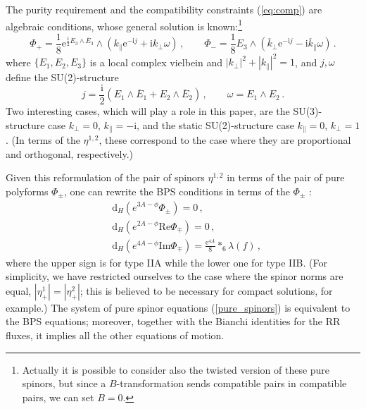 \documentclass[12pt]{article}
\renewcommand{\Re}{\mathrm{Re}}
\renewcommand{\Im}{\mathrm{Im}}
\newcommand{\dd}{\mathrm{d}}
\newcommand{\e}{\mathrm{e}}
\newcommand{\ii}{\mathrm{i}}
\begin{document}
The purity requirement and the compatibility constraints (\ref{eq:comp}) are algebraic conditions, whose general solution is known:\footnote{Actually it is possible to consider also the twisted version of these pure spinors, but since a $B$-transformation sends compatible pairs in compatible pairs, we can set $B=0$.}
\begin{equation}
\label{eq:dynamicSU(2)}
\Phi_+ = \frac{1}{8} \e^{\frac{1}{2} E_3 \wedge \overline{E}_3} \wedge (k_\parallel\e^{- \ii j} + \ii k_\perp \omega) \, , \qquad \Phi_- = \frac{1}{8}  E_3 \wedge (\overline{k}_\perp \e^{- \ii j} - \ii \overline{k}_\parallel  \omega) \, .
\end{equation}
where $\{E_1,E_2,E_3\}$ is a local complex vielbein and $|k_\perp|^2 + |k_\parallel|^2=1$, and $j,\omega$ define the SU(2)-structure
\begin{equation}
\label{eq:SU(2)-vielbein}
j = \frac{\ii}{2} (E_1 \wedge \overline{E}_1+E_2 \wedge \overline{E}_2) \, , \qquad \omega =  E_1 \wedge E_2 \, .
\end{equation}
Two interesting cases, which will play a role in this paper, are the SU(3)-structure case $k_\perp = 0$, $k_\parallel= - \ii $, and the static SU(2)-structure case $k_\parallel= 0$, $k_\perp = 1$. (In terms of the $\eta^{1,2}$, these correspond to the case where they are proportional and orthogonal, respectively.)

Given this reformulation of the pair of spinors $\eta^{1,2}$ in terms of the pair of pure polyforms $\Phi_\pm$, one can rewrite the BPS conditions in terms of the $\Phi_\pm$ \cite{gmpt2}:
\begin{subequations}
\label{pure_spinors}
\begin{align}
&\dd_H ( e^{3A-\phi} \Phi_\pm) = 0 \, ,\label{pure_spinors1}\\
&\dd_H( e^{2A-\phi} \Re\Phi_\mp) = 0 \, ,\label{pure_spinors2} \\
&\dd_H ( e^{4A-\phi}\Im\Phi_\mp) = \frac{\e^{4A}}{8} *_6 \lambda(f) \, , \label{pure_spinors3}
\end{align}
\end{subequations} 
where the upper sign is for type IIA while the lower one for type IIB. (For simplicity, we have restricted ourselves to the case where the spinor norms are equal, $|\eta^1_+|=|\eta^2_+|$; this is believed to be necessary for compact solutions, for example.) The system of pure spinor equations (\ref{pure_spinors}) is equivalent to the BPS equations; moreover, together with the Bianchi identities for the RR fluxes, it implies all the other equations of motion. 
\end{document}
